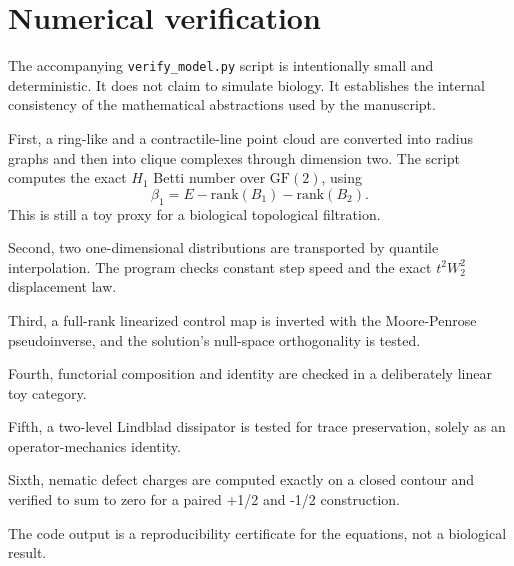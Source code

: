 \documentclass[11pt]{article}
\begin{document}
\section{Numerical verification}
The accompanying \texttt{verify\_model.py} script is intentionally small and deterministic. It does not claim to simulate biology. It establishes the internal consistency of the mathematical abstractions used by the manuscript.

First, a ring-like and a contractile-line point cloud are converted into radius graphs and then into clique complexes through dimension two. The script computes the exact $H_1$ Betti number over $\mathrm{GF}(2)$, using
\begin{equation}
 \beta_1=E-\mathrm{rank}(B_1)-\mathrm{rank}(B_2).
\label{eq:beta1complex}
\end{equation}
This is still a toy proxy for a biological topological filtration.

Second, two one-dimensional distributions are transported by quantile interpolation. The program checks constant step speed and the exact $t^2W_2^2$ displacement law.

Third, a full-rank linearized control map is inverted with the Moore-Penrose pseudoinverse, and the solution's null-space orthogonality is tested.

Fourth, functorial composition and identity are checked in a deliberately linear toy category.

Fifth, a two-level Lindblad dissipator is tested for trace preservation, solely as an operator-mechanics identity.

Sixth, nematic defect charges are computed exactly on a closed contour and verified to sum to zero for a paired +1/2 and -1/2 construction.

The code output is a reproducibility certificate for the equations, not a biological result.
\end{document}
